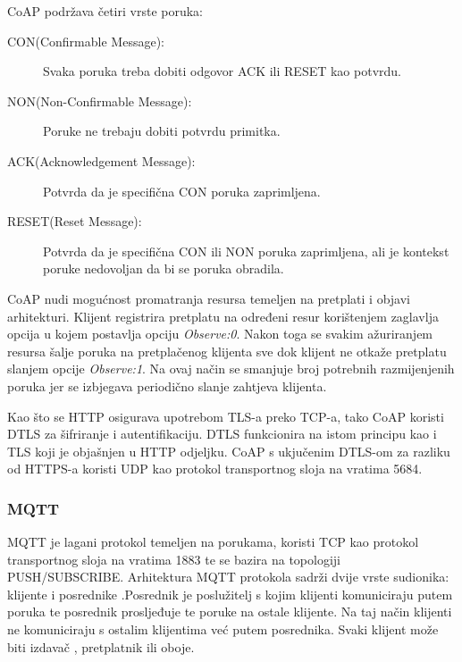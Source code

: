 \documentclass[times, utf8, diplomski]{fer}
\begin{document}
CoAP podržava četiri vrste poruka:
\begin{description}
    \item[CON(Confirmable Message):]Svaka poruka treba dobiti odgovor ACK ili RESET kao potvrdu.
    \item[NON(Non-Confirmable Message):]Poruke ne trebaju dobiti potvrdu primitka.
    \item[ACK(Acknowledgement Message):]Potvrda da je specifična CON poruka zaprimljena.
    \item[RESET(Reset Message):]Potvrda da je specifična CON ili NON poruka zaprimljena, ali je kontekst poruke nedovoljan da bi se poruka obradila.
\end{description}

CoAP nudi mogućnost promatranja resursa temeljen na pretplati i objavi arhitekturi. Klijent registrira pretplatu na određeni resur korištenjem zaglavlja opcija u kojem postavlja opciju \emph{Observe:0}. Nakon toga se svakim ažuriranjem resursa šalje poruka na pretplačenog klijenta sve dok klijent ne otkaže pretplatu slanjem opcije \emph{Observe:1}. Na ovaj način se smanjuje broj potrebnih razmijenjenih poruka jer se izbjegava periodično slanje zahtjeva klijenta.

Kao što se HTTP osigurava upotrebom TLS-a preko TCP-a, tako CoAP koristi DTLS  za šifriranje i autentifikaciju. DTLS funkcionira na istom principu kao i TLS koji je objašnjen u HTTP odjeljku. CoAP s ukjučenim DTLS-om za razliku od HTTPS-a koristi UDP kao protokol transportnog sloja na vratima 5684.

\subsubsection{MQTT}
MQTT  je lagani protokol temeljen na porukama, koristi TCP kao protokol transportnog sloja na vratima 1883 te se bazira na topologiji PUSH/SUBSCRIBE. Arhitektura MQTT protokola sadrži dvije vrste sudionika: klijente i posrednike .Posrednik je poslužitelj s kojim klijenti komuniciraju putem poruka te posrednik prosljeđuje te poruke na ostale klijente. Na taj način klijenti ne komuniciraju s ostalim klijentima već putem posrednika. Svaki klijent može biti izdavač , pretplatnik  ili oboje. 
\end{document}
